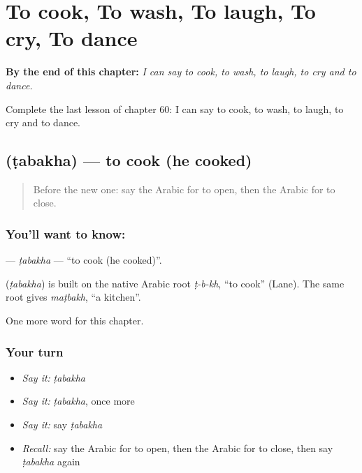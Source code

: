 
\chapter{To cook, To wash, To laugh, To cry, To dance}
\label{ch:ar-to-cook-to-wash-to-laugh-to-cry-to-dance}

\begin{chapteropening}
\textbf{By the end of this chapter:} \emph{I can say to cook, to wash, to laugh, to cry and to dance.}

Complete the last lesson of chapter 60: I can say to cook, to wash, to laugh, to cry and to dance.
\end{chapteropening}

\section[\texorpdfstring{\ar{طبخ} (ṭabakha)}{طبخ (ṭabakha)}]{ (ṭabakha) — to cook (he cooked)}

\label{lesson:AR-C60-tabakha}



\begin{quote}
Before the new one: say the Arabic for to open, then the Arabic for to close.
\end{quote}

\subsection*{You'll want to know: }
\textbf{} — \emph{ṭabakha} — \textquotedblleft{}to cook (he cooked)\textquotedblright{}.

\begin{cousinweb}
\textbf{} (\emph{ṭabakha}) is built on the native Arabic root \emph{ṭ-b-kh}, \textquotedblleft{}to cook\textquotedblright{} (Lane). The same root gives \emph{maṭbakh}, \textquotedblleft{}a kitchen\textquotedblright{}.
\end{cousinweb}

\begin{grammarlens}[title={What you've built}]
One more word for this chapter.
\end{grammarlens}

\subsection*{Your turn}
\begin{itemize}
\raggedright
  \item \emph{Say it:} \emph{ṭabakha}
  \item \emph{Say it:} \emph{ṭabakha}, once more
  \item \emph{Say it:} say \emph{ṭabakha}
  \item \emph{Recall:} say the Arabic for to open, then the Arabic for to close, then say \emph{ṭabakha} again
\end{itemize}

